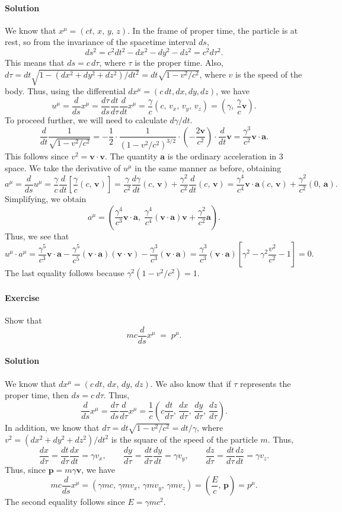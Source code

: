 \documentclass[10pt]{article}
\let\vec\boldsymbol
\newcommand\dd[2]{\frac{d #1}{d #2}}
\renewcommand\v{\vec{v}}
\renewcommand\a{\vec{a}}
\newcounter{prob}
\def\problem{\stepcounter{prob}\paragraph{Exercise \arabic{prob}}}
\def\solution{\paragraph{Solution}}
\begin{document}
        \solution We know that $x^\mu = (ct,\,x,\,y,\,z)$. In the frame of proper time, the particle is at rest, so from the invariance of the
        spacetime interval $ds$,
        \[
                ds^2 = c^2dt^2 - dx^2 - dy^2 - dz^2 = c^2d\tau^2.
        \]
        This means that $ds = c\, d\tau$, where $\tau$ is the proper time. Also, $d\tau = dt\sqrt{1 - (dx^2 + dy^2 + dz^2)/dt^2} = dt\sqrt{1 - v^2 /c^2}$,
        where $v$ is the speed of the body. Thus, using the differential $dx^\mu = (c\, dt, dx, dy, dz)$, we have
        \[
                u^\mu = \dd{}{s}x^\mu = \dd{\tau}{s}\dd{t}{\tau}\dd{}{t} x^\mu = \frac{\gamma}{c}\left(c,\,v_x,\,v_y,\,v_z\right) =
                        \left(\gamma,\,\frac{\gamma}{c}\v\right).
        \]
        To proceed further, we will need to calculate $d\gamma /dt$.
        \[
                \dd{}{t}\frac{1}{\sqrt{1 - v^2 /c^2}} = -\frac{1}{2}\cdot\frac{1}{(1 - v^2 /c^2)^{3 /2}}\cdot\left(-\frac{2\v}{c^2}\right) \cdot\dd{}{t}\v
                        = \frac{\gamma^3}{c^2} \v\cdot\a. 
        \]
        This follows since $v^2 = \v\cdot\v$. The quantity $\a$ is the ordinary acceleration in 3 space.
        We take the derivative of $u^\mu$ in the same manner as before, obtaining
        \[
                a^\mu = \dd{}{s}u^\mu = \frac{\gamma}{c}\dd{}{t}\left[\frac{\gamma}{c} (c,\,\v )\right] = \frac{\gamma}{c^2}\dd{\gamma}{t}(c,\,\v) + 
                        \frac{\gamma^2}{c^2}\dd{}{t}(c,\,\v) = \frac{\gamma^4}{c^4}\v\cdot\a(c,\,\v) + \frac{\gamma^2}{c^2}(0,\,\a).
        \]
        Simplifying, we obtain
        \[
                a^\mu = \left(\frac{\gamma^4}{c^3}\v\cdot \a,\; \frac{\gamma^4}{c^4}(\v\cdot\a)\v + \frac{\gamma^2}{c^2}\a\right).
        \]
        Thus, we see that
        \[
                u^\mu\cdot a^\mu = \frac{\gamma^5}{c^3}\v\cdot\a - \frac{\gamma^5}{c^5}(\v\cdot\a)(\v\cdot\v) - \frac{\gamma^3}{c^3}(\v\cdot\a)
                        = \frac{\gamma^3}{c^3}(\v\cdot\a)\left[\gamma^2 - \gamma^2 \frac{v^2}{c^2} - 1\right] = 0.
        \]
        The last equality follows because $\gamma^2 (1 - v^2 /c^2) = 1$.

        \problem Show that \[
                mc \dd{}{s}x^\mu \;=\; p^\mu.
        \]

        \solution We know that $dx^\mu = (c\, dt,\,dx,\,dy,\,dz)$. We also know that if $\tau$ represents the proper time, then $ds = c\, d\tau$.
        Thus,
        \[
                \dd{}{s}x^\mu = \dd{\tau}{s}\dd{}{\tau}x^\mu = \frac{1}{c} \left( c\dd{t}{\tau},\,\dd{x}{\tau},\,\dd{y}{\tau},\,\dd{z}{\tau} \right).
        \]
        In addition, we know that $d\tau = dt \sqrt{1 - v^2 /c^2} = dt /\gamma$, where $v^2 = (dx^2 + dy^2 + dz^2) /dt^2$ is the square of the speed
        of the particle $m$. Thus,
        \[
                \dd{x}{\tau} = \dd{t}{\tau} \dd{x}{t} = \gamma v_x, \qquad
                \dd{y}{\tau} = \dd{t}{\tau} \dd{y}{t} = \gamma v_y, \qquad
                \dd{z}{\tau} = \dd{t}{\tau} \dd{z}{t} = \gamma v_z.
        \]
        Thus, since $\vec{p} = m\gamma \v$, we have
        \[
                mc\dd{}{s}x^\mu = \left( \gamma mc,\,\gamma mv_x,\,\gamma mv_y,\,\gamma mv_z \right) = \left(\frac{E}{c},\,\vec{p}\right) = p^\mu.
        \]
        The second equality follows since $E = \gamma mc^2$.
\end{document}
